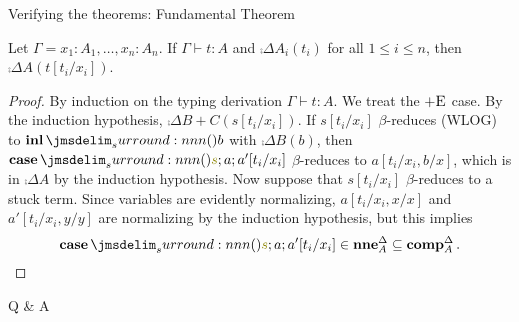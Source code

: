 \documentclass{beamer}
\begin{document}
\begin{frame}{Verifying the theorems: Fundamental Theorem}
  \begin{theorem}
    Let $\Gamma = x_1 : A_1,\ldots,x_n : A_n$.
    If $\Gamma \vdash t : A$ and $\comp{\Delta}{A_i}(t_i)$ for all $1 \leq i \leq n$, then $\comp{\Delta}{A}(t[t_i/x_i])$.
  \end{theorem}
  \begin{proof}
    By induction on the typing derivation $\Gamma \vdash t : A$.
    We treat the $\textsc{$+$E}$ case.
    By the induction hypothesis, $\comp{\Delta}{B + C}(s[t_i/x_i])$.
    If $s[t_i/x_i]$ $\beta$-reduces (WLOG) to $\tmInl{b}$ with $\comp{\Delta}{B}(b)$, then $\tmCase{s}{a}{a'}[t_i/x_i]$ $\beta$-reduces to $a[t_i/x_i,b/x]$, which is in $\comp{\Delta}{A}$ by the induction hypothesis.
    Now suppose that $s[t_i/x_i]$ $\beta$-reduces to a stuck term.
    Since variables are evidently normalizing, $a[t_i/x_i,x/x]$ and $a'[t_i/x_i,y/y]$ are normalizing by the induction hypothesis, but this implies
    \[
      \tmCase{s}{a}{a'}[t_i/x_i] \in \neu{\Delta}{A} \subseteq \comp{\Delta}{A}.
    \]
  \end{proof}
\end{frame}

\begin{frame}{Q \& A}
  
\end{frame}
\end{document}

